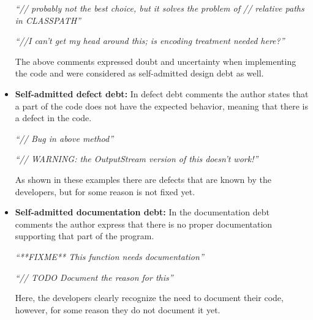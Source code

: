 \begin{itemize}
  \vspace{1mm}
  \begin{displayquote}
      \textit{``// probably not the best choice, but it solves the problem of // relative paths in CLASSPATH''}

      \vspace{1mm}

      \textit{``//I can't get my head around this; is encoding treatment needed here?''}
  \end{displayquote}
  \vspace{1mm}

The above comments expressed doubt and uncertainty when implementing the code and were considered as self-admitted design debt as well.

\item \textbf{Self-admitted defect debt:} In defect debt comments the author states that a part of the code does not have the expected behavior, meaning that there is a defect in the code. 
  
  \vspace{1mm}
  \begin{displayquote}
      \textit{``// Bug in above method''}

      \vspace{1mm}

      \textit{``// WARNING: the OutputStream version of this doesn't work!''}
  \end{displayquote}
  \vspace{1mm}
  
As shown in these examples there are defects that are known by the developers, but for some reason is not fixed yet. 

  \item \textbf{Self-admitted documentation debt:} In the documentation debt comments the author express that there is no proper documentation supporting that part of the program.
  
  \vspace{1mm}
  \begin{displayquote}
  	\textit{``**FIXME** This function needs documentation''}
  	
  	\vspace{1mm}
  	
  	\textit{``// TODO Document the reason for this''}
  \end{displayquote}
  \vspace{1mm}
  
  Here, the developers clearly recognize the need to document their code, however, for some reason they do not document it yet.
  

\end{itemize}
